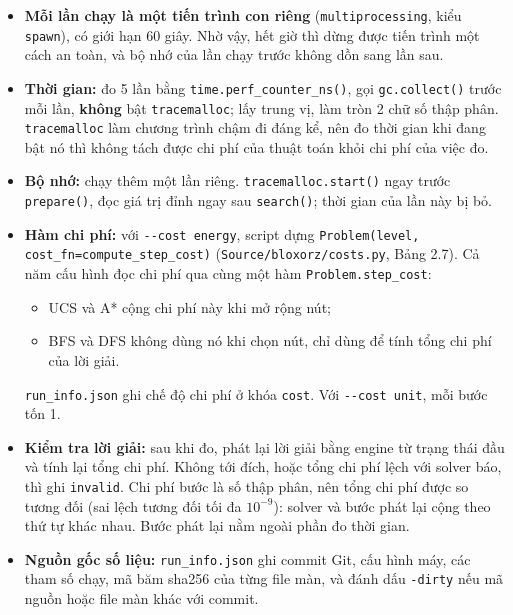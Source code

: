 \begin{itemize}
\tightlist
\item
  \textbf{Mỗi lần chạy là một tiến trình con riêng} (\texttt{multiprocessing}, kiểu \texttt{spawn}), có giới hạn 60 giây. Nhờ vậy, hết giờ thì dừng được tiến trình một cách an toàn, và bộ nhớ của lần chạy trước không dồn sang lần sau.
\item
  \textbf{Thời gian:} đo 5 lần bằng \texttt{time.\allowbreak{}perf\_\allowbreak{}counter\_\allowbreak{}ns()}, gọi \texttt{gc.\allowbreak{}collect()} trước mỗi lần, \textbf{không} bật \texttt{tracemalloc}; lấy trung vị, làm tròn 2 chữ số thập phân. \texttt{tracemalloc} làm chương trình chậm đi đáng kể, nên đo thời gian khi đang bật nó thì không tách được chi phí của thuật toán khỏi chi phí của việc đo.
\item
  \textbf{Bộ nhớ:} chạy thêm một lần riêng. \texttt{tracemalloc.\allowbreak{}start()} ngay trước \texttt{prepare()}, đọc giá trị đỉnh ngay sau \texttt{search()}; thời gian của lần này bị bỏ.
\item
  \textbf{Hàm chi phí:} với \texttt{-\allowbreak{}-\allowbreak{}cost energy}, script dựng \texttt{Problem(level, cost\_\allowbreak{}fn=compute\_\allowbreak{}step\_\allowbreak{}cost)} (\texttt{Source/\allowbreak{}bloxorz/\allowbreak{}costs.\allowbreak{}py}, Bảng 2.7). Cả năm cấu hình đọc chi phí qua cùng một hàm \texttt{Problem.\allowbreak{}step\_\allowbreak{}cost}:

  \begin{itemize}
  \tightlist
  \item
    UCS và A* cộng chi phí này khi mở rộng nút;
  \item
    BFS và DFS không dùng nó khi chọn nút, chỉ dùng để tính tổng chi phí của lời giải.
  \end{itemize}

  \texttt{run\_\allowbreak{}info.\allowbreak{}json} ghi chế độ chi phí ở khóa \texttt{cost}. Với \texttt{-\allowbreak{}-\allowbreak{}cost unit}, mỗi bước tốn 1.
\item
  \textbf{Kiểm tra lời giải:} sau khi đo, phát lại lời giải bằng engine từ trạng thái đầu và tính lại tổng chi phí. Không tới đích, hoặc tổng chi phí lệch với solver báo, thì ghi \texttt{invalid}. Chi phí bước là số thập phân, nên tổng chi phí được so tương đối (sai lệch tương đối tối đa \(10^{-9}\)): solver và bước phát lại cộng theo thứ tự khác nhau. Bước phát lại nằm ngoài phần đo thời gian.
\item
  \textbf{Nguồn gốc số liệu:} \texttt{run\_\allowbreak{}info.\allowbreak{}json} ghi commit Git, cấu hình máy, các tham số chạy, mã băm sha256 của từng file màn, và đánh dấu \texttt{-\allowbreak{}dirty} nếu mã nguồn hoặc file màn khác với commit.
\end{itemize}


